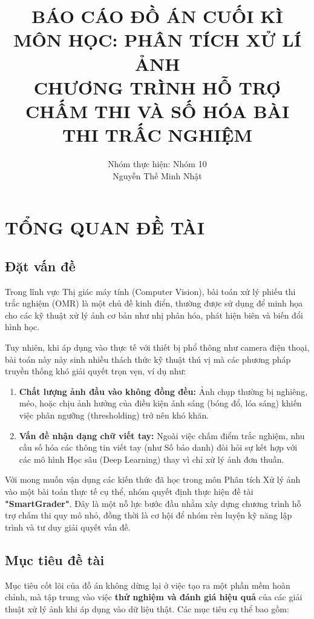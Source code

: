 \documentclass[6pt, a4paper]{report}
\title{\textbf{BÁO CÁO ĐỒ ÁN CUỐI KÌ \\ MÔN HỌC: PHÂN TÍCH XỬ LÍ ẢNH} \\ CHƯƠNG TRÌNH HỖ TRỢ CHẤM THI VÀ SỐ HÓA BÀI THI TRẤC NGHIỆM}
\author{Nhóm thực hiện: Nhóm 10 \\ Nguyễn Thế Minh Nhật}
\date{}
\begin{document}
	
	\maketitle 
	
	\tableofcontents
	\newpage
	
	\chapter{TỔNG QUAN ĐỀ TÀI}
	
	\section{Đặt vấn đề}
	Trong lĩnh vực Thị giác máy tính (Computer Vision), bài toán xử lý phiếu thi trắc nghiệm (OMR) là một chủ đề kinh điển, thường được sử dụng để minh họa cho các kỹ thuật xử lý ảnh cơ bản như nhị phân hóa, phát hiện biên và biến đổi hình học.
	
	Tuy nhiên, khi áp dụng vào thực tế với thiết bị phổ thông như camera điện thoại, bài toán này nảy sinh nhiều thách thức kỹ thuật thú vị mà các phương pháp truyền thống khó giải quyết trọn vẹn, ví dụ như:
	\begin{enumerate}
		\item \textbf{Chất lượng ảnh đầu vào không đồng đều:} Ảnh chụp thường bị nghiêng, méo, hoặc chịu ảnh hưởng của điều kiện ánh sáng (bóng đổ, lóa sáng) khiến việc phân ngưỡng (thresholding) trở nên khó khăn.
		\item \textbf{Vấn đề nhận dạng chữ viết tay:} Ngoài việc chấm điểm trắc nghiệm, nhu cầu số hóa các thông tin viết tay (như Số báo danh) đòi hỏi sự kết hợp với các mô hình Học sâu (Deep Learning) thay vì chỉ xử lý ảnh đơn thuần.
	\end{enumerate}
	
	Với mong muốn vận dụng các kiến thức đã học trong môn Phân tích Xử lý ảnh vào một bài toán thực tế cụ thể, nhóm quyết định thực hiện đề tài \textbf{"SmartGrader"}. Đây là một nỗ lực bước đầu nhằm xây dựng chương trình hỗ trợ chấm thi quy mô nhỏ, đồng thời là cơ hội để nhóm rèn luyện kỹ năng lập trình và tư duy giải quyết vấn đề.
	
	\section{Mục tiêu đề tài}
	Mục tiêu cốt lõi của đồ án không dừng lại ở việc tạo ra một phần mềm hoàn chỉnh, mà tập trung vào việc \textbf{thử nghiệm và đánh giá hiệu quả} của các giải thuật xử lý ảnh khi áp dụng vào dữ liệu thật. Các mục tiêu cụ thể bao gồm:
	
\end{document}

